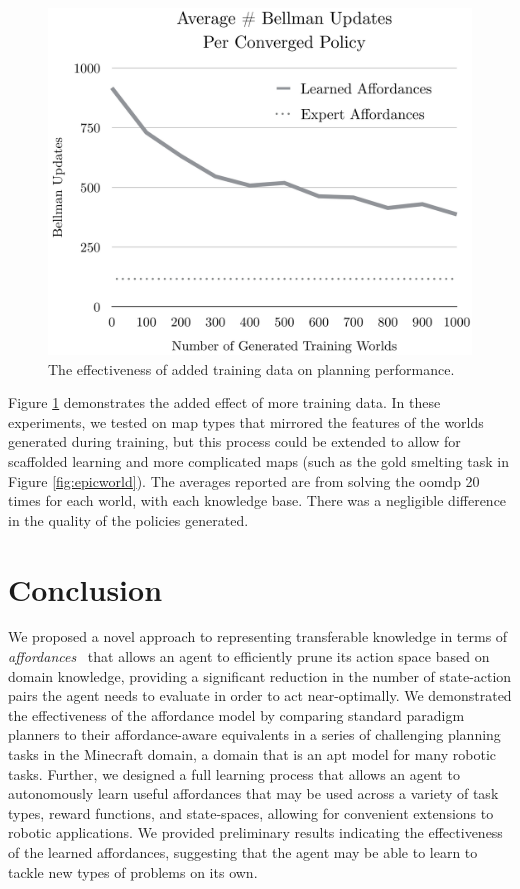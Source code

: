 \documentclass[letterpaper]{article}
\begin{document}
\begin{figure}[b]
\centering
\includegraphics[scale=0.195]{figures/training_results.png}%
  \caption{The effectiveness of added training data on planning performance.}
  \label{fig:training_results}
\end{figure}

Figure \ref{fig:training_results} demonstrates the added effect of more training data. In these experiments, we tested on map types that mirrored the features of the worlds generated during training, but this process could be extended to allow for scaffolded learning and more complicated maps (such as the gold smelting task in Figure \ref{fig:epicworld}). The averages reported are from solving the \gls{oomdp} 20 times for each world, with each knowledge base. There was a negligible difference in the quality of the policies generated.

\section{Conclusion}
\label{sec:conclusion}

We proposed a novel approach to representing transferable knowledge in terms of
{\em affordances}~\cite{gibson77} that allows an agent to efficiently
prune its action space based on domain knowledge,
providing a significant reduction in the number of state-action pairs the
agent needs to evaluate in order to act near-optimally. We demonstrated the effectiveness of the affordance model by comparing standard paradigm
planners to their affordance-aware equivalents in a series of challenging planning tasks in the Minecraft
domain, a domain that is an apt model for many robotic tasks. Further, we designed a full learning process that allows an agent to autonomously learn useful affordances that may be used
across a variety of task types, reward functions, and state-spaces, allowing for convenient extensions to robotic applications.
We provided preliminary results indicating the effectiveness of the learned affordances, suggesting that
the agent may be able to learn to tackle new types of problems on its own.
\end{document}
